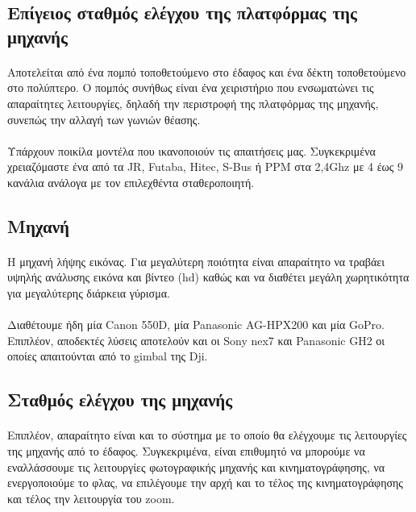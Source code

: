 \documentclass[a4paper, 12pt, twoside]{report}
\begin{document}
{{{{{{			
		\subsection{Επίγειος σταθμός ελέγχου της πλατφόρμας της μηχανής}
			\paragraph{}{Αποτελείται από ένα πομπό τοποθετούμενο στο έδαφος και ένα δέκτη τοποθετούμενο στο πολύπτερο. Ο πομπός συνήθως είναι ένα χειριστήριο που ενσωματώνει τις απαραίτητες λειτουργίες, δηλαδή την περιστροφή της πλατφόρμας της μηχανής, συνεπώς την αλλαγή των γωνιών θέασης.
			}
			\paragraph{}{Υπάρχουν ποικίλα μοντέλα που ικανοποιούν τις απαιτήσεις μας. Συγκεκριμένα χρειαζόμαστε ένα από τα JR, Futaba, Hitec, S-Bus ή PPM στα 2,4Ghz με 4 έως 9 κανάλια ανάλογα με τον επιλεχθέντα σταθεροποιητή.
			}
		
		\subsection{Μηχανή}
			\paragraph{}{Η μηχανή λήψης εικόνας. Για μεγαλύτερη ποιότητα είναι απαραίτητο να τραβάει υψηλής ανάλυσης εικόνα και βίντεο (hd) καθώς και να διαθέτει μεγάλη χωρητικότητα για μεγαλύτερης διάρκεια γύρισμα.
			}
			\paragraph{}{Διαθέτουμε ήδη μία Canon 550D, μία Panasonic AG-HPX200 και μία GoPro. Επιπλέον, αποδεκτές λύσεις αποτελούν και οι Sony nex7 και Panasonic GH2 οι οποίες απαιτούνται από το gimbal της Dji.
			}
		
		\subsection{Σταθμός ελέγχου της μηχανής}	
			\paragraph{}{Επιπλέον, απαραίτητο είναι και το σύστημα με το οποίο θα ελέγχουμε τις λειτουργίες της μηχανής από το έδαφος. Συγκεκριμένα, είναι επιθυμητό να μπορούμε να εναλλάσσουμε τις λειτουργίες φωτογραφικής μηχανής και κινηματογράφησης, να ενεργοποιούμε το φλας, να επιλέγουμε την αρχή και το τέλος της κινηματογράφησης και τέλος την λειτουργία του zoom.
			}
}}}}}}
\end{document}
